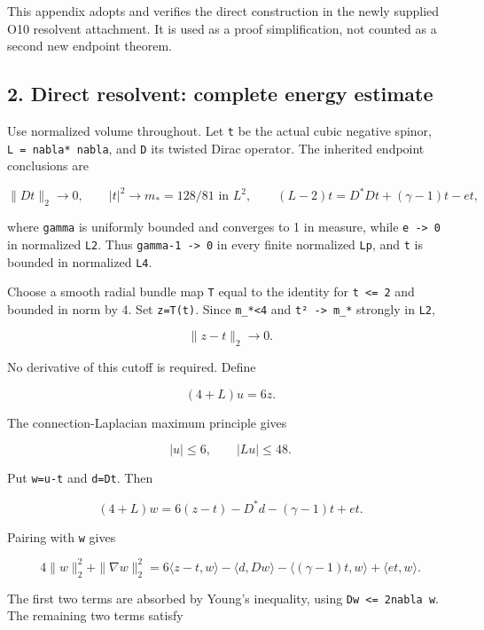 \documentclass[11pt]{article}
\begin{document}
This appendix adopts and verifies the direct construction in the newly
supplied O10 resolvent attachment. It is used as a proof simplification,
not counted as a second new endpoint theorem.

\hypertarget{direct-resolvent-complete-energy-estimate}{%
\subsection{2. Direct resolvent: complete energy
estimate}\label{direct-resolvent-complete-energy-estimate}}

Use normalized volume throughout. Let \texttt{t} be the actual cubic
negative spinor, \texttt{L\ =\ nabla*\ nabla}, and \texttt{D} its
twisted Dirac operator. The inherited endpoint conclusions are

\[
 \|Dt\|_2\to0,\qquad |t|^2\to m_* =128/81\text{ in }L^2,
 \qquad (L-2)t=D^*Dt+(\gamma-1)t-et,
\]

where \texttt{gamma} is uniformly bounded and converges to 1 in measure,
while \texttt{e\ -\textgreater{}\ 0} in normalized \texttt{L2}. Thus
\texttt{gamma-1\ -\textgreater{}\ 0} in every finite normalized
\texttt{Lp}, and \texttt{t} is bounded in normalized \texttt{L4}.

Choose a smooth radial bundle map \texttt{T} equal to the identity for
\texttt{\textbar{}t\textbar{}\ \textless{}=\ 2} and bounded in norm by
4. Set \texttt{z=T(t)}. Since \texttt{m\_*\textless{}4} and
\texttt{\textbar{}t\textbar{}²\ -\textgreater{}\ m\_*} strongly in
\texttt{L2},

\[
 \|z-t\|_2\to0.
\]

No derivative of this cutoff is required. Define

\[
 (4+L)u=6z.
\tag{B.2.1}
\]

The connection-Laplacian maximum principle gives

\[
 |u|\le6,\qquad |Lu|\le48.
\tag{B.2.2}
\]

Put \texttt{w=u-t} and \texttt{d=Dt}. Then

\[
 (4+L)w=6(z-t)-D^*d-(\gamma-1)t+et.
\]

Pairing with \texttt{w} gives

\[
 4\|w\|_2^2+\|\nabla w\|_2^2
 =6\langle z-t,w\rangle-\langle d,Dw\rangle
 -\langle(\gamma-1)t,w\rangle+\langle et,w\rangle.
\]

The first two terms are absorbed by Young's inequality, using
\texttt{\textbar{}Dw\textbar{}\ \textless{}=\ 2\textbar{}nabla\ w\textbar{}}.
The remaining two terms satisfy
\end{document}
